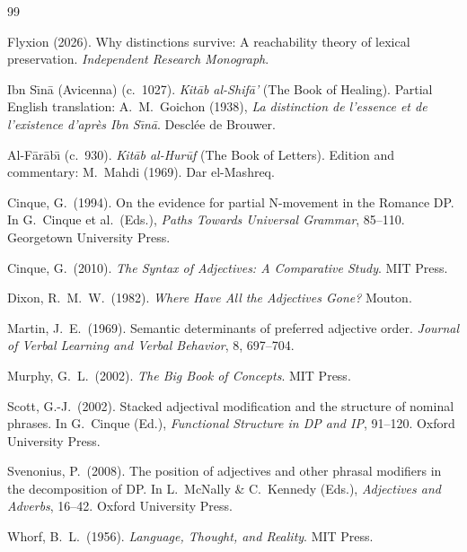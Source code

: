 \documentclass[11pt]{article}
\theoremstyle{rthm}
\theoremstyle{rdef}
\theoremstyle{remark}
\begin{document}
\begin{thebibliography}{99}

Flyxion (2026).
Why distinctions survive: A reachability theory of lexical preservation.
\textit{Independent Research Monograph}.

Ibn S\={\i}n\=a (Avicenna) (c.\ 1027).
\textit{Kit\=ab al-Shif\=a'} (The Book of Healing).
Partial English translation: A.\ M.\ Goichon (1938),
\textit{La distinction de l'essence et de l'existence d'apr\`es Ibn S\={\i}n\=a}.
Descl\'ee de Brouwer.

Al-F\=ar\=ab\={\i} (c.\ 930).
\textit{Kit\=ab al-Hur\=uf} (The Book of Letters).
Edition and commentary: M.\ Mahdi (1969).
Dar el-Mashreq.

Cinque, G.\ (1994).
On the evidence for partial N-movement in the Romance DP.
In G.\ Cinque et al.\ (Eds.), \textit{Paths Towards Universal Grammar},
85--110. Georgetown University Press.

Cinque, G.\ (2010).
\textit{The Syntax of Adjectives: A Comparative Study}.
MIT Press.

Dixon, R.\ M.\ W.\ (1982).
\textit{Where Have All the Adjectives Gone?}
Mouton.

Martin, J.\ E.\ (1969).
Semantic determinants of preferred adjective order.
\textit{Journal of Verbal Learning and Verbal Behavior}, 8, 697--704.

Murphy, G.\ L.\ (2002).
\textit{The Big Book of Concepts}.
MIT Press.

Scott, G.-J.\ (2002).
Stacked adjectival modification and the structure of nominal phrases.
In G.\ Cinque (Ed.), \textit{Functional Structure in DP and IP}, 91--120.
Oxford University Press.

Svenonius, P.\ (2008).
The position of adjectives and other phrasal modifiers in the decomposition
of DP.
In L.\ McNally \& C.\ Kennedy (Eds.),
\textit{Adjectives and Adverbs}, 16--42. Oxford University Press.

Whorf, B.\ L.\ (1956).
\textit{Language, Thought, and Reality}.
MIT Press.

\end{thebibliography}
\end{document}
